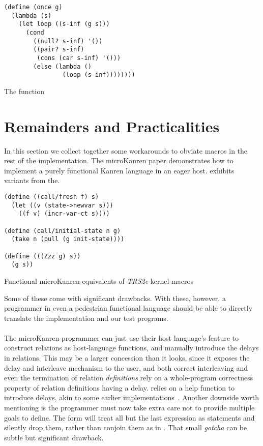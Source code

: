 \documentclass[sigplan,balance,pbalance,natbib=false]{acmart}
\begin{document}
\begin{listing}
  \begin{verbatim}
(define (once g)
  (lambda (s)
    (let loop ((s-inf (g s)))
      (cond
        ((null? s-inf) '())
        ((pair? s-inf)
         (cons (car s-inf) '()))
        (else (lambda ()
                (loop (s-inf))))))))
  \end{verbatim}
  \caption{The  function}\label{mnt:condu-reimplementation}
\end{listing}


\section{Remainders and Practicalities}\label{sec:functional}

In this section we collect together some workarounds to obviate macros
in the rest of the implementation. The \citeyear{hemann2013muKanren}
microKanren paper demonstrates how to implement a purely functional
Kanren language in an eager host.
 exhibits variants from
the.

\begin{listing}
  \begin{verbatim}
(define ((call/fresh f) s)
  (let ((v (state->newvar s)))
    ((f v) (incr-var-ct s))))

(define (call/initial-state n g)
  (take n (pull (g init-state))))

(define (((Zzz g) s))
  (g s))
  \end{verbatim}
  \caption{Functional microKanren equivalents of \emph{TRS2e} kernel macros}\label{mnt:call-fresh-and-call-initial-state}
\end{listing}

Some of these come with significant drawbacks. With these, however, a
programmer in even a pedestrian functional language should be able to
directly translate the implementation and our test programs.

\paragraph{}

The microKanren programmer can just use their host
language's  feature to construct relations as
host-language functions, and manually introduce the delays in
relations. This may be a larger concession than it looks, since it
exposes the delay and interleave mechanism to the user, and both
correct interleaving and even the termination of relation
\emph{definitions} rely on a whole-program correctness property of
relation definitions having a delay.  relies on a
help function  to introduce delays, akin to some
earlier implementations~\cite{hemann2013muKanren}. Another downside
worth mentioning is the programmer must now take extra care not to
provide multiple goals to define. The  form will
treat all but the last expression as statements and silently drop
them, rather than conjoin them as in . That small
\emph{gotcha} can be subtle but significant drawback.
\end{document}
